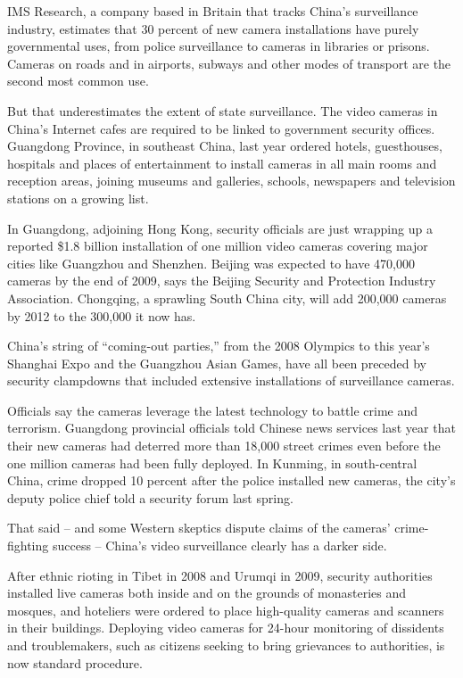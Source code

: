 ﻿\documentclass[12pt]{article}
\begin{document}
IMS Research, a company based in Britain that tracks China's surveillance industry, estimates that
30 percent of new camera installations have purely governmental uses, from police surveillance to
cameras in libraries or prisons. Cameras on roads and in airports, subways and other modes of
transport are the second most common use.

But that underestimates the extent of state surveillance. The video cameras in China's Internet
cafes are required to be linked to government security offices. Guangdong Province, in southeast
China, last year ordered hotels, guesthouses, hospitals and places of entertainment to install
cameras in all main rooms and reception areas, joining museums and galleries, schools, newspapers
and television stations on a growing list.

In Guangdong, adjoining Hong Kong, security officials are just wrapping up a reported \$1.8 billion
installation of one million video cameras covering major cities like Guangzhou and Shenzhen. Beijing
was expected to have 470,000 cameras by the end of 2009, says the Beijing Security and Protection
Industry Association. Chongqing, a sprawling South China city, will add 200,000 cameras by 2012 to
the 300,000 it now has.

China's string of ``coming-out parties,'' from the 2008 Olympics to this year's Shanghai Expo and
the Guangzhou Asian Games, have all been preceded by security clampdowns that included extensive
installations of surveillance cameras.

Officials say the cameras leverage the latest technology to battle crime and terrorism. Guangdong
provincial officials told Chinese news services last year that their new cameras had deterred more
than 18,000 street crimes even before the one million cameras had been fully deployed. In Kunming,
in south-central China, crime dropped 10 percent after the police installed new cameras, the city's
deputy police chief told a security forum last spring.

That said -- and some Western skeptics dispute claims of the cameras' crime-fighting success --
China's video surveillance clearly has a darker side.

After ethnic rioting in Tibet in 2008 and Urumqi in 2009, security authorities installed live
cameras both inside and on the grounds of monasteries and mosques, and hoteliers were ordered to
place high-quality cameras and scanners in their buildings. Deploying video cameras for 24-hour
monitoring of dissidents and troublemakers, such as citizens seeking to bring grievances to
authorities, is now standard procedure.
\end{document}
